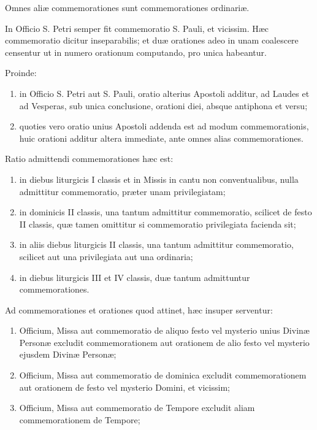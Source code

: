 \documentclass[vesperale_romanum.tex]{subfiles}
\begin{document}
Omnes aliæ commemorationes sunt commemora­tiones ordinariæ.

In Officio S. Petri semper fit commemoratio S. Pauli, et vicissim. Hæc commemoratio dicitur inseparabilis; et duæ orationes adeo in unam coalescere censentur ut in numero orationum computando, pro unica habeantur.

Proinde:

\begin{enumerate}[nosep,label=\alph*.]
\item in Officio S. Petri aut S. Pauli, oratio alterius Apostoli additur, ad Laudes et ad Vesperas, sub unica conclusione, orationi diei, absque antiphona et versu;
\item
quoties vero oratio unius Apostoli addenda est ad modum commemorationis, huic orationi additur altera immediate, ante omnes alias commemorationes.
\end{enumerate}

Ratio admittendi commemorationes hæc est:
\begin{enumerate}[nosep,label=\alph*.]
\item 
in diebus liturgicis I classis et in Missis in cantu non conventualibus, nulla admittitur commemoratio, præter unam privilegiatam;
\item
in dominicis II classis, una tantum admittitur commemoratio, scilicet de festo II classis, quæ tamen omittitur si commemoratio privilegiata facienda sit;
\item
in aliis diebus liturgicis II classis, una tantum admittitur commemoratio, scilicet aut una privilegiata aut una ordinaria;
\item
in diebus liturgicis III et IV classis, duæ tantum admittuntur commemorationes.
\end{enumerate}

Ad commemorationes et orationes quod attinet, hæc insuper serventur:
\begin{enumerate}[nosep,label=\alph*.]
\item Officium, Missa aut commemoratio de aliquo festo vel mysterio unius Divinæ Personæ excludit commemorationem aut orationem de alio festo vel mysterio ejusdem Divinæ Personæ;
\item
Officium, Missa aut commemoratio de dominica excludit commemorationem aut orationem de festo vel mysterio Domini, et vicissim;
\item
Officium, Missa aut commemoratio de Tempore excludit aliam commemorationem de Tempore;
\end{enumerate}
\end{document}
